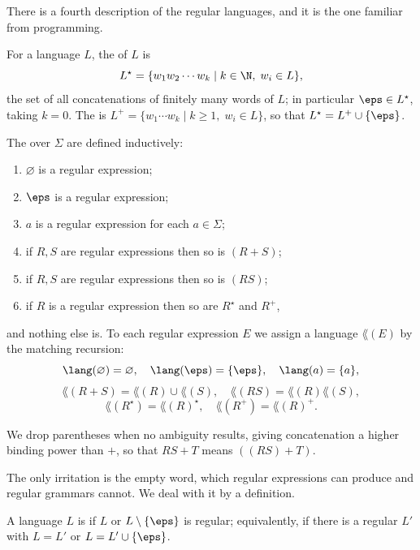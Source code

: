 There is a fourth description of the regular languages, and it is the one familiar from programming.

\begin{definition}
	For a language $L$, the  of $L$ is
	$$L^\star = \{w_1w_2\cdots w_k \mid k \in \N,\; w_i \in L\},$$
	the set of all concatenations of finitely many words of $L$; in particular $\eps \in L^\star$, taking $k = 0$. The  is $L^+ = \{w_1\cdots w_k \mid k \geq 1,\; w_i \in L\}$, so that $L^\star = L^+ \cup \{\eps\}$.
\end{definition}

\begin{definition}
	The  over $\Sigma$ are defined inductively:
	\begin{enumerate}[label=(\roman*)]
		\item $\varnothing$ is a regular expression;
		\item $\eps$ is a regular expression;
		\item $a$ is a regular expression for each $a \in \Sigma$;
		\item if $R,S$ are regular expressions then so is $(R+S)$;
		\item if $R,S$ are regular expressions then so is $(RS)$;
		\item if $R$ is a regular expression then so are $R^\star$ and $R^+$,
	\end{enumerate}
	and nothing else is. To each regular expression $E$ we assign a language $\lang(E)$ by the matching recursion:
	$$\lang(\varnothing) = \varnothing, \quad \lang(\eps) = \{\eps\}, \quad \lang(a) = \{a\},$$
	$$\lang(R+S) = \lang(R)\cup\lang(S), \quad \lang(RS) = \lang(R)\lang(S),$$
	$$\lang(R^\star) = \lang(R)^\star, \quad \lang(R^+) = \lang(R)^+.$$
\end{definition}

We drop parentheses when no ambiguity results, giving concatenation a higher binding power than $+$, so that $RS + T$ means $((RS)+T)$.

The only irritation is the empty word, which regular expressions can produce and regular grammars cannot. We deal with it by a definition.

\begin{definition}
	A language $L$ is  if $L$ or $L \setminus \{\eps\}$ is regular; equivalently, if there is a regular $L'$ with $L = L'$ or $L = L' \cup \{\eps\}$.
\end{definition}

